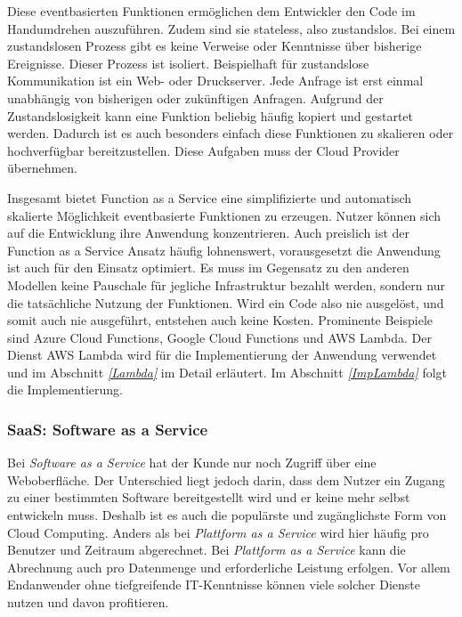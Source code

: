    Diese eventbasierten Funktionen ermöglichen dem Entwickler den Code im Handumdrehen auszuführen.
   Zudem sind sie stateless, also zustandslos. Bei einem zustandslosen Prozess gibt es keine Verweise oder Kenntnisse über bisherige Ereignisse.
   Dieser Prozess ist isoliert. Beispielhaft für zustandslose Kommunikation ist ein Web- oder Druckserver.
   Jede Anfrage ist erst einmal unabhängig von bisherigen oder zukünftigen Anfragen.\cite{Zustandslos}
   Aufgrund der Zustandslosigkeit kann eine Funktion beliebig häufig kopiert und gestartet werden.
   Dadurch ist es auch besonders einfach diese Funktionen zu skalieren oder hochverfügbar bereitzustellen.
   Diese Aufgaben muss der Cloud Provider übernehmen.

   Insgesamt bietet Function as a Service eine simplifizierte und automatisch skalierte Möglichkeit eventbasierte Funktionen zu erzeugen.
   Nutzer können sich auf die Entwicklung ihre Anwendung konzentrieren.
   Auch preislich ist der Function as a Service Ansatz häufig lohnenswert, vorausgesetzt die Anwendung ist auch für den Einsatz optimiert.
   Es muss im Gegensatz zu den anderen Modellen keine Pauschale für
   jegliche Infrastruktur bezahlt werden, sondern nur die tatsächliche Nutzung der Funktionen. Wird ein Code also nie ausgelöst, und somit auch nie ausgeführt,
   entstehen auch keine Kosten.
   Prominente Beispiele sind Azure Cloud Functions, Google Cloud Functions und AWS Lambda.
   Der Dienst AWS Lambda wird für die Implementierung der Anwendung verwendet und im Abschnitt \textit{\ref{Lambda} } im Detail erläutert.
   Im Abschnitt \textit{\ref{ImpLambda} } folgt die Implementierung.\cite{LambdaZitat}

   \subsubsection{SaaS: Software as a Service}
   Bei \textsl{Software as a Service} hat der Kunde nur noch Zugriff über eine Weboberfläche.
   Der Unterschied liegt jedoch darin, dass dem Nutzer ein Zugang zu einer bestimmten Software bereitgestellt wird und er keine mehr selbst entwickeln muss.
   Deshalb ist es auch die populärste und zugänglichste Form von Cloud Computing.
   Anders als bei \textsl{Plattform as a Service} wird hier häufig pro Benutzer und Zeitraum abgerechnet.
   Bei \textsl{Plattform as a Service} kann die Abrechnung auch pro Datenmenge und erforderliche Leistung erfolgen.
   Vor allem Endanwender ohne tiefgreifende IT-Kenntnisse können viele solcher Dienste nutzen und davon profitieren. \cite{SaaS}

